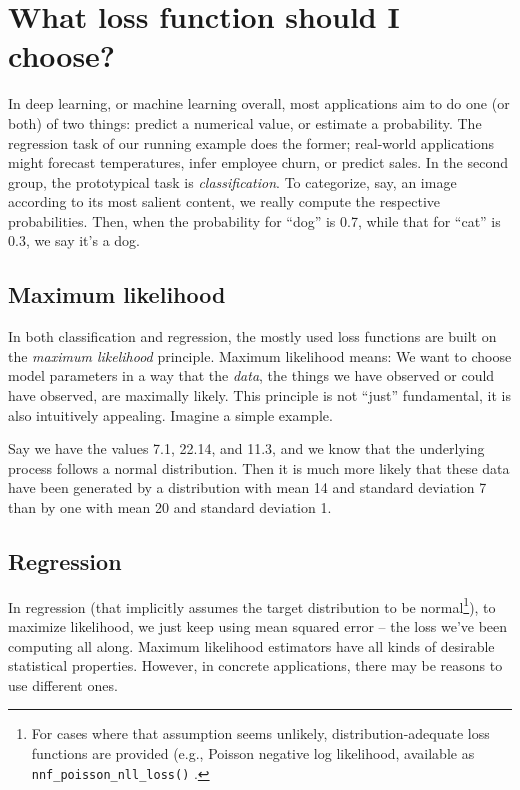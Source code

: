 \documentclass[
  letterpaper,
]{krantz}
\begin{document}
\hypertarget{what-loss-function-should-i-choose}{%
\section{What loss function should I
choose?}\label{what-loss-function-should-i-choose}}

In deep learning, or machine learning overall, most applications aim to
do one (or both) of two things: predict a numerical value, or estimate a
probability. The regression task of our running example does the former;
real-world applications might forecast temperatures, infer employee
churn, or predict sales. In the second group, the prototypical task is
\emph{classification}. To categorize, say, an image according to its
most salient content, we really compute the respective probabilities.
Then, when the probability for ``dog'' is 0.7, while that for ``cat'' is
0.3, we say it's a dog.

\hypertarget{maximum-likelihood}{%
\subsection{Maximum likelihood}\label{maximum-likelihood}}

In both classification and regression, the mostly used loss functions
are built on the \emph{maximum likelihood} principle. Maximum likelihood
means: We want to choose model parameters in a way that the \emph{data},
the things we have observed or could have observed, are maximally
likely. This principle is not ``just'' fundamental, it is also
intuitively appealing. Imagine a simple example.

Say we have the values 7.1, 22.14, and 11.3, and we know that the
underlying process follows a normal distribution. Then it is much more
likely that these data have been generated by a distribution with mean
14 and standard deviation 7 than by one with mean 20 and standard
deviation 1.

\hypertarget{regression}{%
\subsection{Regression}\label{regression}}

In regression (that implicitly assumes the target distribution to be
normal\footnote{For cases where that assumption seems unlikely,
  distribution-adequate loss functions are provided (e.g., Poisson
  negative log likelihood, available as
  \texttt{nnf\_poisson\_nll\_loss()} .}), to maximize likelihood, we
just keep using mean squared error -- the loss we've been computing all
along. Maximum likelihood estimators have all kinds of desirable
statistical properties. However, in concrete applications, there may be
reasons to use different ones.
\end{document}

